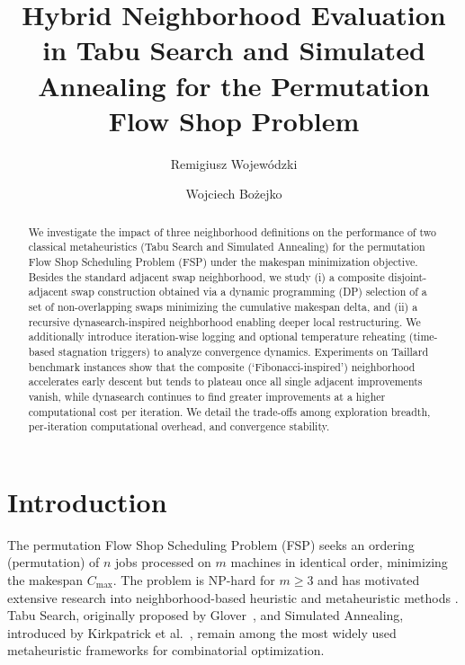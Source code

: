 \documentclass[runningheads]{llncs}
\begin{document}
\title{Hybrid Neighborhood Evaluation in Tabu Search and Simulated Annealing for the Permutation Flow Shop Problem}

\author{Remigiusz Wojewódzki \and Wojciech Bożejko}


\maketitle

\begin{abstract}
We investigate the impact of three neighborhood definitions on the performance of two classical metaheuristics (Tabu Search and Simulated Annealing) for the permutation Flow Shop Scheduling Problem (FSP) under the makespan minimization objective. Besides the standard adjacent swap neighborhood, we study (i) a composite disjoint-adjacent swap construction obtained via a dynamic programming (DP) selection of a set of non-overlapping swaps minimizing the cumulative makespan delta, and (ii) a recursive dynasearch-inspired neighborhood enabling deeper local restructuring. We additionally introduce iteration-wise logging and optional temperature reheating (time-based stagnation triggers) to analyze convergence dynamics. Experiments on Taillard benchmark instances show that the composite (`Fibonacci-inspired') neighborhood accelerates early descent but tends to plateau once all single adjacent improvements vanish, while dynasearch continues to find greater improvements at a higher computational cost per iteration. We detail the trade-offs among exploration breadth, per-iteration computational overhead, and convergence stability.

\end{abstract}

\section{Introduction}
The permutation Flow Shop Scheduling Problem (FSP) seeks an ordering (permutation) of $n$ jobs processed on $m$ machines in identical order, minimizing the makespan $C_{\max}$. The problem is NP-hard for $m \ge 3$ and has motivated extensive research into neighborhood-based heuristic and metaheuristic methods \cite{ref_metaheuristics_survey,ref_classic_fsp,vanlaarhoven1992}. 
Tabu Search, originally proposed by Glover~\cite{glover1986,glover1997}, and Simulated Annealing, introduced by Kirkpatrick et al.~\cite{kirkpatrick1983}, remain among the most widely used metaheuristic frameworks for combinatorial optimization.
\end{document}
